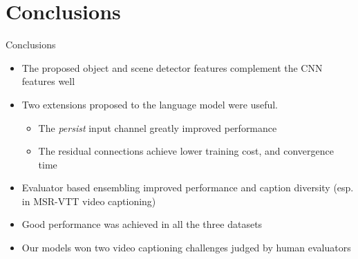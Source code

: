 \documentclass{beamer}
\begin{document}
\section{Conclusions}
\begin{frame}{Conclusions}
\begin{itemize}
    \item The proposed object and scene detector features complement the CNN features well 
    \item Two extensions proposed to the language model were useful. 
       \begin{itemize}
           \item The \emph{persist} input channel greatly improved performance
           \item The residual connections achieve lower training cost, and convergence time
       \end{itemize}
    \item Evaluator based ensembling improved performance and caption diversity (esp. in MSR-VTT video captioning)
    \item Good performance was achieved in all the three datasets
    \item Our models won two video captioning challenges judged by human evaluators 
\end{itemize}
\end{frame}
\end{document}
